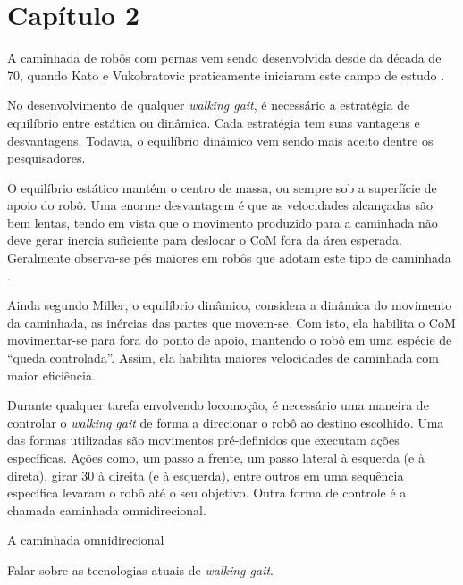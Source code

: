 \chapter{Capítulo 2}

A caminhada de robôs com pernas vem sendo desenvolvida desde da década de 70, quando Kato e Vukobratovic praticamente iniciaram este campo de estudo \cite{kajita2008}.

\begin{draft}
	No desenvolvimento de qualquer \textit{walking gait}, é necessário a estratégia de equilíbrio entre estática ou dinâmica. Cada estratégia tem suas vantagens e desvantagens. Todavia, o equilíbrio dinâmico vem sendo mais aceito dentre os pesquisadores.
\end{draft}

O equilíbrio estático mantém o centro de massa, ou  sempre sob a superfície de apoio do robô. Uma enorme desvantagem é que as velocidades alcançadas são bem lentas, tendo em vista que o movimento produzido para a caminhada não deve gerar inercia suficiente para deslocar o CoM fora da área esperada. Geralmente observa-se pés maiores em robôs que adotam este tipo de caminhada \cite{miller1994}.

Ainda segundo Miller, o equilíbrio dinâmico, considera a dinâmica do movimento da caminhada, as inércias das partes que movem-se. Com isto, ela habilita o CoM movimentar-se para fora do ponto de apoio, mantendo o robô em uma espécie de ``queda controlada''. Assim, ela habilita maiores velocidades de caminhada com maior eficiência.


Durante qualquer tarefa envolvendo locomoção, é necessário uma maneira de controlar o \textit{walking gait} de forma a direcionar o robô ao destino escolhido. Uma das formas utilizadas são movimentos pré-definidos que executam ações específicas. Ações como, um passo a frente, um passo lateral à esquerda (e à direta), girar 30\deg{} à direita (e à esquerda), entre outros em uma sequência específica levaram o robô até o seu objetivo. Outra forma de controle é a chamada caminhada omnidirecional.

A caminhada omnidirecional 

\begin{guide}
	Falar sobre as tecnologias atuais de \textit{walking gait}.
\end{guide}

